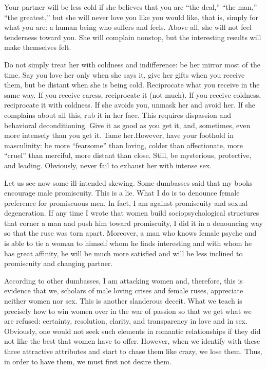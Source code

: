 \par Your partner will be less cold if she believes that you are \enquote{the deal,} \enquote{the man,} \enquote{the greatest,} but she will never love you like you would like, that is, simply for what you are: a human being who suffers and feels. Above all, she will not feel tenderness toward you. She will complain nonstop, but the interesting results will make themselves felt.

\par Do not simply treat her with coldness and indifference: be her mirror most of the time. Say you love her only when she says it, give her gifts when you receive them, but be distant when she is being cold. Reciprocate what you receive in the same way. If you receive caress, reciprocate it (not much). If you receive coldness, reciprocate it with coldness. If she avoids you, unmask her and avoid her. If she complains about all this, rub it in her face. This requires dispassion and behavioral deconditioning. Give it as good as you get it, and, sometimes, even more intensely than you get it. Tame her.\footnotemark[9] However, have your foothold in masculinity: be more \enquote{fearsome} than loving, colder than affectionate, more \enquote{cruel} than merciful, more distant than close. Still, be mysterious, protective, and leading. Obviously, never fail to exhaust her with intense sex.


\par Let us see now some ill-intended skewing. Some dumbasses said that my books encourage male promiscuity. This is a lie. What I do is to denounce female preference for promiscuous men. In fact, I am against promiscuity and sexual degeneration. If any time I wrote that women build sociopsychological structures that corner a man and push him toward promiscuity, I did it in a denouncing way so that the ruse was torn apart. Moreover, a man who knows female psyche and is able to tie a woman to himself whom he finds interesting and with whom he has great affinity, he will be much more satisfied and will be less inclined to promiscuity and changing partner.

\par According to other dumbasses, I am attacking women and, therefore, this is evidence that we, scholars of male loving crises and female ruses, appreciate neither women nor sex. This is another slanderous deceit. What we teach is precisely how to win women over in the war of passion so that we get what we are refused: certainty, resolution, clarity, and transparency in love and in sex. Obviously, one would not seek such elements in romantic relationships if they did not like the best that women have to offer. However, when we identify with these three attractive attributes and start to chase them like crazy, we lose them. Thus, in order to have them, we must first not desire them.

